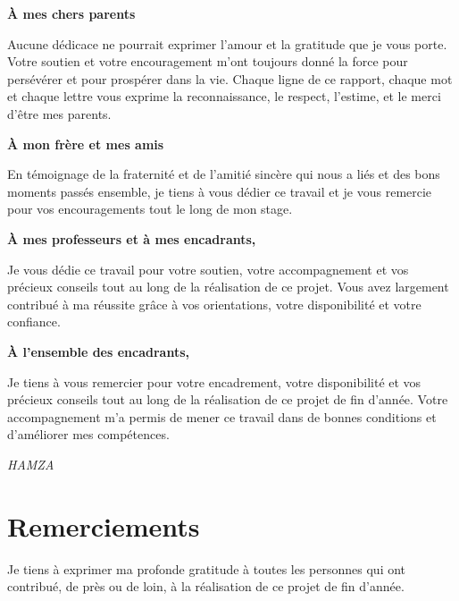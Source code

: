 \documentclass[12pt,a4paper,twoside]{report}
\begin{document}
\textbf{À mes chers parents}

Aucune dédicace ne pourrait exprimer l'amour et la gratitude que je vous porte. Votre soutien et votre encouragement m'ont toujours donné la force pour persévérer et pour prospérer dans la vie. Chaque ligne de ce rapport, chaque mot et chaque lettre vous exprime la reconnaissance, le respect, l'estime, et le merci d'être mes parents.

\vspace{0.5cm}

\textbf{À mon frère et mes amis}

En témoignage de la fraternité et de l'amitié sincère qui nous a liés et des bons moments passés ensemble, je tiens à vous dédier ce travail et je vous remercie pour vos encouragements tout le long de mon stage.

\vspace{0.5cm}

\textbf{À mes professeurs et à mes encadrants,}

Je vous dédie ce travail pour votre soutien, votre accompagnement et vos précieux conseils tout au long de la réalisation de ce projet. Vous avez largement contribué à ma réussite grâce à vos orientations, votre disponibilité et votre confiance.

\vspace{0.5cm}

\textbf{À l'ensemble des encadrants,}

Je tiens à vous remercier pour votre encadrement, votre disponibilité et vos précieux conseils tout au long de la réalisation de ce projet de fin d'année. Votre accompagnement m'a permis de mener ce travail dans de bonnes conditions et d'améliorer mes compétences.

\vspace{0.5cm}

\begin{flushright}
\textit{HAMZA}
\end{flushright}

\chapter*{Remerciements}

\vspace*{1cm}

Je tiens à exprimer ma profonde gratitude à toutes les personnes qui ont contribué, de près ou de loin, à la réalisation de ce projet de fin d'année.
\end{document}
